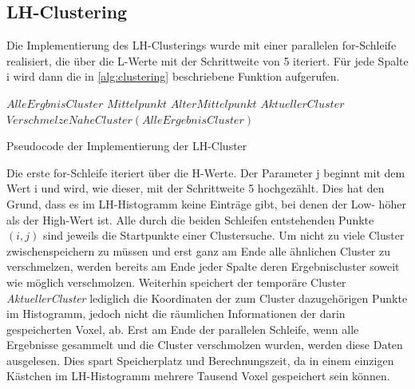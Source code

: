 \subsection{LH-Clustering}

Die Implementierung des LH-Clusterings wurde mit einer parallelen for-Schleife realisiert, die über die L-Werte mit der Schrittweite von 5 iteriert. Für jede Spalte i wird dann die in \autoref{alg:clustering} beschriebene Funktion aufgerufen.


\begin{algorithm}[h]

 \BlankLine
 $AlleErgbnisCluster$\;
 $Mittelpunkt$\;
 $AlterMittelpunkt$\;
 $AktuellerCluster$\;
$VerschmelzeNaheCluster(AlleErgebnisCluster)$\;
\;

 \caption{Pseudocode der Implementierung der LH-Cluster}
 \label{alg:clustering}
\end{algorithm}


Die erste for-Schleife iteriert über die H-Werte. Der Parameter j beginnt mit dem Wert i und wird, wie dieser, mit der Schrittweite 5 hochgezählt. Dies hat den Grund, dass es im LH-Histogramm keine Einträge gibt, bei denen der Low- höher als der High-Wert ist. Alle durch die beiden Schleifen entstehenden Punkte $(i, j)$ sind jeweils die Startpunkte einer Clustersuche.
Um nicht zu viele Cluster zwischenspeichern zu müssen und erst ganz am Ende alle ähnlichen Cluster zu verschmelzen, werden bereits am Ende jeder Spalte deren Ergebniscluster soweit wie möglich verschmolzen.
Weiterhin speichert der temporäre Cluster \textit{AktuellerCluster} lediglich die Koordinaten der zum Cluster dazugehörigen Punkte im Histogramm, jedoch nicht die räumlichen Informationen der darin gespeicherten Voxel, ab. Erst am Ende der parallelen Schleife, wenn alle Ergebnisse gesammelt und die Cluster verschmolzen wurden, werden diese Daten ausgelesen. Dies spart Speicherplatz und Berechnungszeit, da in einem einzigen Kästchen im LH-Histogramm mehrere Tausend Voxel gespeichert sein können.


